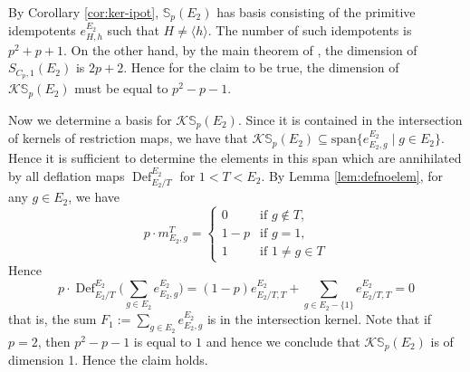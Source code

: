 \documentclass[12pt]{article}
\theoremstyle{plain}
\theoremstyle{definition}
\newcommand{\kerlin}{\mathbb S_p}
\newcommand{\defl}{\operatorname{Def}}
\begin{document}
By Corollary \ref{cor:ker-ipot}, $\kerlin(E_2)$ has basis consisting of the primitive idempotents $e_{H, h}^{E_2}$ such that $H\not = \langle h\rangle$. The number of such idempotents is $p^2 + p + 1$. On the other hand, by the main theorem of \cite{Bouc3}, the dimension of $S_{C_p, 1}(E_2)$ is $2p + 2$. Hence for the claim to be true, the dimension of $\mathcal K\kerlin(E_2)$ must be equal to $p^2-p-1$. 

Now we determine a basis for $\mathcal K\kerlin(E_2)$. Since it is contained in the intersection of kernels of restriction maps, we have that $\mathcal K\kerlin(E_2)\subseteq \mathrm{span}\{ e_{E_2, g}^{E_2}\mid g\in E_2\}$. Hence it is sufficient to determine the elements in this span which are annihilated by all deflation maps $\defl^{E_2}_{E_2/T}$ for $1< T< E_2$. By Lemma \ref{lem:defnoelem}, for any $g\in E_2$, we have
\[
p\cdot m_{E_2, g}^T =  \begin{cases}
              0 & \text{if } g\not\in T,\\
            1-p & \text{if } g = 1,\\
            1 & \text{if } 1\not = g\in T
          \end{cases} 
\]
Hence
\[
p\cdot\defl^{E_2}_{E_2/T}\Big(\sum_{g\in E_2}e_{E_2, g}^{E_2}\Big) =
(1-p)e_{E_2/T, T}^{E_2} + \sum_{g\in E_2-\{1\}} e_{E_2/T, T}^{E_2} = 0
\] 
that is, the sum $F_1:= \sum_{g\in E_2}e_{E_2, g}^{E_2}$ is in the intersection kernel. Note that if $p=2$, then $p^2 - p - 1$ is equal to $1$ and hence we conclude that $\mathcal{K}\kerlin(E_2)$ is of dimension 1. Hence the claim holds.
\end{document}
